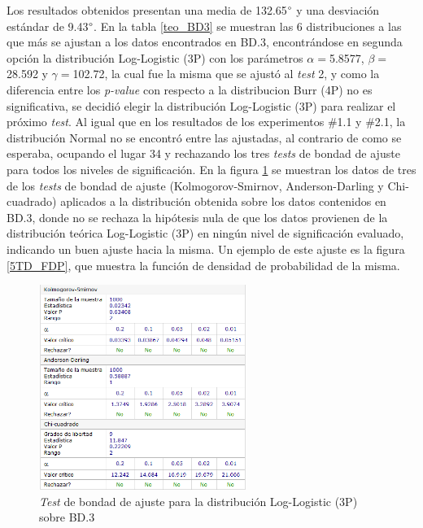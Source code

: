 \documentclass[12pt]{report}
\begin{document}
Los resultados obtenidos presentan una media de 132.65$\degree$ y una desviación estándar de 9.43$\degree$. En la tabla \ref{teo_BD3}  se muestran las 6 distribuciones a las que más se ajustan a los datos encontrados en BD.3, encontrándose en segunda opción la distribución Log-Logistic (3P) con los parámetros $\alpha=$5.8577, $\beta=$28.592 y $\gamma=$102.72, la cual fue la misma que se ajustó al \textit{test} 2, y como la diferencia entre los \textit{p-value} con respecto a la distribucion Burr (4P) no es significativa, se decidió elegir la distribución Log-Logistic (3P) para realizar el próximo \textit{test}. Al igual que en los resultados de los experimentos \#1.1 y \#2.1, la distribución Normal no se encontró entre las ajustadas, al contrario de como se esperaba, ocupando el lugar 34 y rechazando los tres \textit{tests} de bondad de ajuste para todos los niveles de significación. En la figura \ref{5TD_BONDAD} se  muestran los datos de tres de los \textit{tests} de bondad de ajuste (Kolmogorov-Smirnov, Anderson-Darling y Chi-cuadrado) aplicados a la distribución obtenida sobre los datos contenidos en BD.3, donde no se rechaza la hipótesis nula de que los datos provienen de la distribución teórica Log-Logistic (3P) en ningún nivel de significación evaluado, indicando un buen ajuste hacia la misma. Un ejemplo de este ajuste es la figura \ref{5TD_FDP}, que muestra la función de densidad de probabilidad de la misma. 
\begin{figure}[ht]
	\centering
	
	\includegraphics[width=0.6\textwidth]{5td_bondad.png}
	\caption{\textit{Test} de bondad de ajuste para la distribución Log-Logistic (3P) sobre BD.3}
	\label{5TD_BONDAD}
\end{figure}
         
\end{document}
